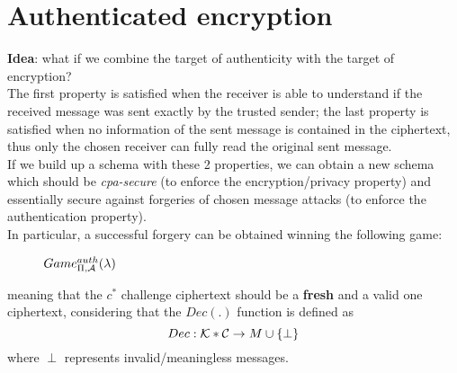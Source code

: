 \section{Authenticated encryption}
\textbf{Idea}: what if we combine the target of authenticity with the
target of encryption?\\
The first property is satisfied when the receiver is able to understand if the
received message was sent exactly by the trusted sender; the last property is
satisfied when no information of the sent message is contained in the ciphertext,
thus only the chosen receiver can fully read the original sent message.\\
If we build up a schema with these 2 properties, we can obtain a new schema
which should be \textit{cpa-secure} (to enforce the encryption/privacy property)
and essentially secure against forgeries of chosen message attacks (to enforce
the authentication property).\\
In particular, a successful forgery can be obtained winning the following game:

\begin{figure}[h!]
   \centering
   \sdinit{}
   \caption{$Game _{\Pi, \mathcal{A}}^{auth}(\lambda)$}
\end{figure}
meaning that the $c^{*}$ challenge ciphertext should be a \textbf{fresh} and a
valid one ciphertext, considering
that the $Dec(.)$ function is defined as
\[
    Dec:\mathcal{K}*\mathcal{C} \to M \cup \{\perp\} 
\]
where $\perp$ represents invalid/meaningless messages.\\

